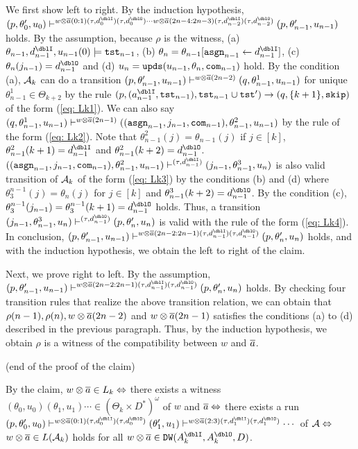 We first show left to right.
By the induction hypothesis,
$(p,\theta'_0,u_0)\vdash^{w\otimes\overa(0:1)(\tau,d^\dblI_{0})(\tau,d^\dblO_{0})\cdots w\otimes\overa(2n-4:2n-3)(\tau,d^\dblI_{n-2})(\tau,d^\dblO_{n-2})}(p,\theta'_{n-1},u_{n-1})$ holds.
By the assumption, because $\rho$ is the witness,
(a) $\theta_{n-1}, d^\dblI_{n-1}, u_{n-1}(0) \models \tst_{n-1}$,
(b) $\theta_{n}=\theta_{n-1}[\asgn_{n-1}\leftarrow d^\dblI_{n-1}]$,
(c) $\theta_{n}(j_{n-1}) = d^\dblO_{n-1}$ and
(d) $u_{n}=\mathtt{upds}(u_{n-1},\theta_n,\mathtt{com}_{n-1})$ hold.
By the condition (a),
${\cal A}_k$ can do a transition
$(p,\theta'_{n-1},u_{n-1})\vdash^{w\otimes{\overline{a}}(2n-2)}
(q,\theta^1_{n-1},u_{n-1})$ for unique $\theta^1_{n-1}\in\Theta_{k+2}$ by the rule $(p, (a^\dblI_{n-1}, \tst_{n-1}), \tst_{n-1}\cup\tst') \to (q, \{k+1\}, \skip)$ of the form (\ref{eq: Lk1}).
We can also say
$(q,\theta^1_{n-1},u_{n-1})\vdash^{w\otimes{\overline{a}}(2n-1)}
((\mathtt{asgn}_{n-1}, j_{n-1}, \mathtt{com}_{n-1}),\theta^2_{n-1},u_{n-1})$ by the rule of the form (\ref{eq: Lk2}). Note that $\theta^2_{n-1}(j)=\theta_{n-1}(j)$ if $j\in[k]$, $\theta^2_{n-1}(k+1)=d^\dblI_{n-1}$ and
$\theta^2_{n-1}(k+2)=d^\dblO_{n-1}$.
$((\asgn_{n-1}, j_{n-1}, \com_{n-1}),\theta^2_{n-1},u_{n-1})\vdash^{(\tau,d^\dblI_{n-1})}(j_{n-1},\theta^3_{n-1},u_{n})$ is also valid transition of ${\cal A}_k$ of the form (\ref{eq: Lk3}) by the conditions (b) and (d)
where $\theta_3^{n-1}(j)=\theta_{n}(j)$
for $j\in[k]$ and $\theta^3_{n-1}(k+2)=d^\dblO_{n-1}$.
By the condition (c), $\theta_3^{n-1}(j_{n-1})=\theta_3^{n-1}(k+1)=d^\dblO_{n-1}$ holds.
Thus, a transition $(j_{n-1},\theta^3_{n-1},u_{n})\vdash^{(\tau,d^\dblO_{n-1})}(p,\theta'_{n},u_{n})$ is valid with the rule of the form (\ref{eq: Lk4}).
In conclusion,
$(p,\theta'_{n-1},u_{n-1})\vdash^ {w\otimes\overa(2n-2:2n-1)(\tau,d^\dblI_{n-1})(\tau,d^\dblO_{n-1})}(p,\theta'_{n},u_{n})$
holds, and with the induction hypothesis, we obtain the left to right of the claim.

Next, we prove right to left. By the assumption,
$(p,\theta'_{n-1},u_{n-1})\vdash^ {w\otimes\overa(2n-2:2n-1)(\tau,d^\dblI_{n-1})(\tau,d^\dblO_{n-1})}(p,\theta'_{n},u_{n})$
holds. By checking four transition rules that realize the above transition relation, we can obtain that $\rho(n-1), \rho(n), w\otimes{\overline{a}}(2n-2)$ and $w\otimes{\overline{a}}(2n-1)$ satisfies the conditions (a) to (d) described in the previous paragraph. Thus, by the induction hypothesis,
we obtain $\rho$ is a witness of the compatibility between $w$ and ${\overline{a}}$.
\begin{flushright}
(end of the proof of the claim)
\end{flushright}
By the claim,
$w\otimes{\overline{a}} \in L_k\Leftrightarrow$
there exists a witness $(\theta_0,u_0)(\theta_1, u_1)\cdots\in (\Theta_k\times D^*)^\omega$ of $w$ and ${\overline{a}}\Leftrightarrow$
there exists a run
$(p,\theta'_0,u_0)\vdash^{w\otimes\overa(0:1)(\tau,d^\dblI_{0})(\tau,d^\dblO_{0})}(\theta'_1,u_1)\vdash^{w\otimes\overa(2:3)(\tau,d^\dblI_{1})(\tau,d^\dblO_{1})}\cdots$ of ${\cal A}\Leftrightarrow$
$w\otimes{\overline{a}} \in L({\cal A}_k)$ holds
for all $w\otimes\overa \in \DW(A_k^\dblI, A_k^\dblO, D)$.




